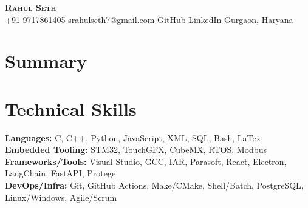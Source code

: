 \documentclass{../templates/simplecv}
\begin{document}
\begin{center}
    \textbf{\Huge \scshape Rahul Seth} \\[10pt]
    \small
    \faMobile\hspace{.5pt} \href{tel:919717861405}{+91 9717861405} \quad
    \faAt\hspace{.5pt} \href{mailto:srahulseth7@gmail.com}{srahulseth7@gmail.com} \quad
    \faGithub\hspace{.5pt} \href{https://github.com/sethr07}{GitHub} \quad
    \faLinkedinSquare\hspace{.5pt} \href{https://www.linkedin.com/in/rahuls7}{LinkedIn} \quad
    \faMapMarker \hspace{.5pt} Gurgaon, Haryana
\end{center}

\section{Summary}
\resumeSubHeadingListStart
{}

\resumeSubHeadingListEnd


\section{Technical Skills}
\resumeSubHeadingListStart
\small{\item{
    \textbf{Languages: } C, C++, Python, JavaScript, XML, SQL, Bash, LaTex \vspace{4pt} \\
    \textbf{Embedded Tooling: } STM32, TouchGFX, CubeMX, RTOS, Modbus \vspace{4pt} \\
    \textbf{Frameworks/Tools: } Visual Studio, GCC, IAR, Parasoft, React, Electron, LangChain, FastAPI, Protege \vspace{4pt} \\
    \textbf{DevOps/Infra: } Git, GitHub Actions, Make/CMake, Shell/Batch, PostgreSQL, Linux/Windows, Agile/Scrum \vspace{4pt} \\
}}
\resumeSubHeadingListEnd
\end{document}
